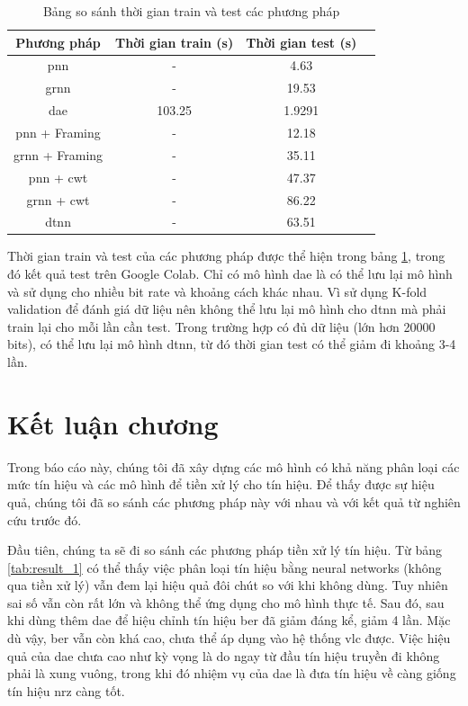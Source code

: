 \begin{table}[ht]
	\caption{Bảng so sánh thời gian train và test các phương pháp}
	\begin{center}
	\small
		\begin{tabular}{|c|c|c|c|}
			\hline 
			Phương pháp & Thời gian train (s) & Thời gian test (s)\\
			\hline 
			\ac{pnn} & - & 4.63 \\
			\hline
			\ac{grnn} & - & 19.53\\
			\hline
			\ac{dae} & 103.25 & 1.9291 \\
			\hline
			\ac{pnn} + Framing & - & 12.18 \\
			\hline
			\ac{grnn} + Framing & - & 35.11 \\
			\hline
			\ac{pnn} + \ac{cwt} & - & 47.37 \\
			\hline
			\ac{grnn} + \ac{cwt} & - & 86.22 \\
			\hline
			\ac{dtnn} & - & 63.51 \\
			\hline
		\end{tabular}
		\label{tab:time}
	\end{center}
\end{table}
Thời gian train và test của các phương pháp được thể hiện trong bảng \ref{tab:time}, trong đó kết quả test trên Google Colab. Chỉ có mô hình \ac{dae} là có thể lưu lại mô hình và sử dụng cho nhiều bit rate và khoảng cách khác nhau. Vì sử dụng K-fold validation để đánh giá dữ liệu nên không thể lưu lại mô hình cho \ac{dtnn} mà phải train lại cho mỗi lần cần test. Trong trường hợp có đủ dữ liệu (lớn hơn 20000 bits), có thể lưu lại mô hình \ac{dtnn}, từ đó thời gian test có thể giảm đi khoảng 3-4 lần. 

\section{Kết luận chương}
Trong báo cáo này, chúng tôi đã xây dựng các mô hình có khả năng phân loại các mức tín hiệu và các mô hình để tiền xử lý cho tín hiệu. Để thấy được sự hiệu quả, chúng tôi đã so sánh các phương pháp này với nhau và với kết quả từ nghiên cứu trước đó.

Đầu tiên, chúng ta sẽ đi so sánh các phương pháp tiền xử lý tín hiệu. Từ bảng \ref{tab:result_1} có thể thấy việc phân loại tín hiệu bằng neural networks (không qua tiền xử lý) vẫn đem lại hiệu quả đôi chút so với khi không dùng. Tuy nhiên sai số vẫn còn rất lớn và không thể ứng dụng cho mô hình thực tế. Sau đó, sau khi dùng thêm \ac{dae} để hiệu chỉnh tín hiệu \ac{ber} đã giảm đáng kể, giảm 4 lần. Mặc dù vậy, \ac{ber} vẫn còn khá cao, chưa thể áp dụng vào hệ thống \ac{vlc} được. Việc hiệu quả của \ac{dae} chưa cao như kỳ vọng là do ngay từ đầu tín hiệu truyền đi không phải là xung vuông, trong khi đó nhiệm vụ của \ac{dae} là đưa tín hiệu về càng giống tín hiệu \ac{nrz} càng tốt.

